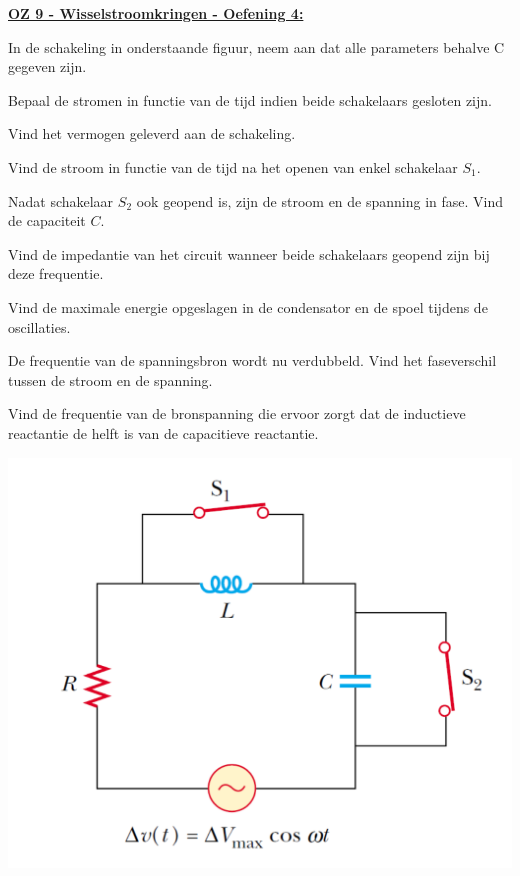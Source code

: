 \textbf{\underline{OZ 9 - Wisselstroomkringen - Oefening 4:}}
\vspace{0.5cm}

In de schakeling in onderstaande figuur, neem aan dat alle parameters behalve C gegeven zijn.

\begin{enumerate}[(a)]
    \item Bepaal de stromen in functie van de tijd indien beide schakelaars gesloten zijn.
    \item Vind het vermogen geleverd aan de schakeling. \vspace{0.3cm} \\ 
\begin{minipage}{.56\textwidth}
    \item Vind de stroom in functie van de tijd na het openen van enkel schakelaar $S_1$.   
    \item Nadat schakelaar $S_2$ ook geopend is, zijn de stroom en de spanning in fase. Vind de capaciteit $C$.
    \item Vind de impedantie van het circuit wanneer beide schakelaars geopend zijn bij deze frequentie.
    \item Vind de maximale energie opgeslagen in de condensator en de spoel tijdens de oscillaties.
    \item De frequentie van de spanningsbron wordt nu verdubbeld. Vind het faseverschil tussen de stroom en de spanning.
    \item Vind de frequentie van de bronspanning die ervoor zorgt dat de inductieve reactantie de helft is van de capacitieve reactantie.
\end{minipage}
\begin{minipage}{.4\textwidth}
   \vspace{-0.5cm}\includegraphics[scale = 0.4]{oz09/resources/Oz9Oef4.png}
\end{minipage}

\end{enumerate}


